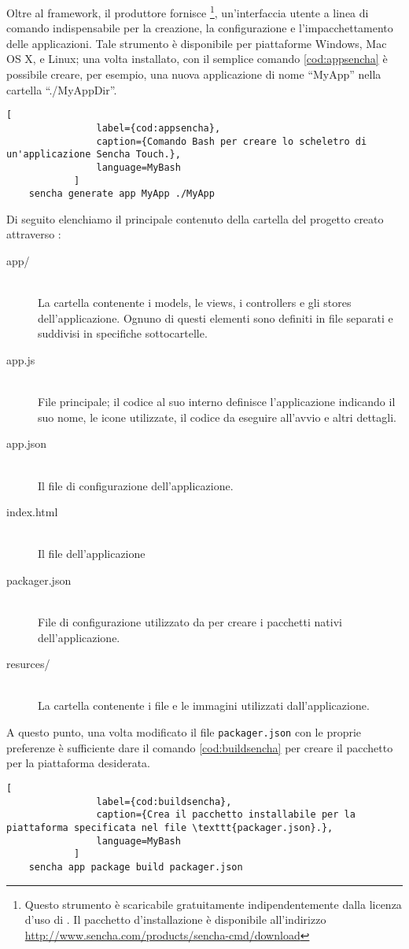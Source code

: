 			Oltre al framework, il produttore fornisce \senchacmd{}\footnote{
			Questo strumento è scaricabile gratuitamente indipendentemente dalla
			licenza d'uso di \senchat{}. Il pacchetto d'installazione è
			disponibile all'indirizzo \url{http://www.sencha.com/products/sencha-cmd/download}},
			un'interfaccia utente a linea di comando indispensabile per la
			creazione, la configurazione e l'impacchettamento delle applicazioni.
			Tale strumento è disponibile per piattaforme Windows, Mac OS X, e Linux;
			una volta installato, con il semplice comando \ref{cod:appsencha} è
			possibile creare, per esempio, una nuova applicazione di nome
			``MyApp'' nella cartella ``./MyAppDir''.
			\begin{lstlisting}[
				label={cod:appsencha},
				caption={Comando Bash per creare lo scheletro di un'applicazione Sencha Touch.},
				language=MyBash
			]
	sencha generate app MyApp ./MyApp
			\end{lstlisting}
			Di seguito elenchiamo il principale contenuto della cartella del
			progetto creato attraverso \senchacmd{}:
			\begin{description}
				\item[app/]\hfill \\
					La cartella contenente i models, le views, i controllers e
					gli stores dell'applicazione. Ognuno di questi elementi sono
					definiti in file \js{} separati e suddivisi in specifiche
					sottocartelle.
				\item[app.js]\hfill \\
					File \js{} principale; il codice al suo interno definisce
					l'applicazione indicando il suo nome, le icone utilizzate,
					il codice da eseguire all'avvio e altri	dettagli. 
				\item[app.json]\hfill \\
					Il file di configurazione dell'applicazione.
				\item[index.html]\hfill \\
					Il file \html{} dell'applicazione
				\item[packager.json]\hfill \\
					File di configurazione utilizzato da \senchacmd{} per creare
					i pacchetti nativi dell'applicazione.
				\item[resurces/]\hfill \\
					La cartella contenente i file \css{} e le immagini utilizzati
					dall'applicazione.
			\end{description}
			A questo punto, una volta modificato il file \verb|packager.json| con
			le proprie preferenze è sufficiente dare il comando \ref{cod:buildsencha}
			per creare il pacchetto per la piattaforma desiderata.
			\begin{lstlisting}[
				label={cod:buildsencha},
				caption={Crea il pacchetto installabile per la piattaforma specificata nel file \texttt{packager.json}.},
				language=MyBash
			]
	sencha app package build packager.json
			\end{lstlisting}
			
